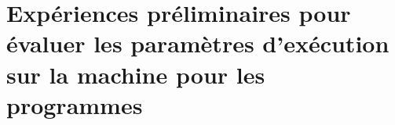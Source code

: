 
\chapter{Expériences préliminaires pour évaluer les paramètres
d'exécution sur la machine  pour les programmes
}
\label{ExperiencesPreliminairesWordCount.ann}




